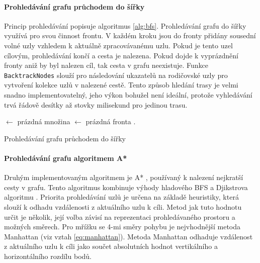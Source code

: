 \documentclass[czech,bachelor,public,dept460,male,oneside]{diploma}
\begin{document}
	\paragraph{Prohledávání grafu průchodem do šířky}
	Princip prohledávání popisuje algoritmus \ref{alg:bfs}. Prohledávání grafu do šířky využívá pro svou činnost frontu. V každém kroku jsou do fronty přidány sousední volné uzly vzhledem k aktuálně zpracovávanému uzlu. Pokud je tento uzel cílovým, prohledávání končí a cesta je nalezena. Pokud dojde k vyprázdnění fronty aniž by byl nalezen cíl, tak cesta v grafu neexistuje. Funkce \texttt{BacktrackNodes} slouží pro následování ukazatelů na rodičovské uzly pro vytvoření kolekce uzlů v nalezené cestě. Tento způsob hledání trasy je velmi snadno implementovatelný, jeho výkon bohužel není ideální, protože vyhledávání trvá řádově desítky až stovky milisekund pro jedinou trasu. \\
	
	\begin{algorithm}[H]
		
		
		
		\BlankLine
		
		\Closed $\leftarrow$ prázdná množina\;
		\Open $\leftarrow$ prázdná fronta\;
		\Open.\;
		\caption{Prohledávání grafu průchodem do šířky}
		\label{alg:bfs}
	\end{algorithm}
	
	\paragraph{Prohledávání grafu algoritmem A*}
	Druhým implementovaným algoritmem je A* \cite{aStar}, používaný k nalezení nejkratší cesty v grafu. Tento algoritmus kombinuje výhody hladového BFS a Djikstrova algoritmu \cite{aStar}. Priorita prohledávání uzlů je určena na základě heuristiky, která slouží k odhadu vzdálenosti z aktuálního uzlu k cíli. Metod jak tuto hodnotu určit je několik, její volba závisí na reprezentaci prohledávaného prostoru a možných směrech. Pro mřížku se 4-mi směry pohybu je nejvhodnější metoda Manhattan (viz vztah \ref{eq:manhattan}). Metoda Manhattan odhaduje vzdálenost z aktuálního uzlu k cíli jako součet absolutních hodnot vertikálního a horizontálního rozdílu bodů.
	
\end{document}
